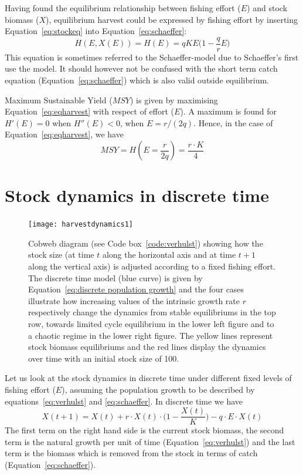 \documentclass[11pt,fleqn]{book} %
\begin{document}
Having found the equilibrium relationship between fishing effort ($E$) and stock biomass ($X$), equilibrium harvest could be expressed by fishing effort by inserting Equation~\ref{eq:stockeq} into Equation~\ref{eq:schaeffer}:
\begin{equation}
\label{eq:eqharvest}
H(E, X(E)) = H(E) = q K E \Big(1 - \frac{q}{r} E\Big)
\end{equation}
This equation is sometimes referred to the Schaeffer-model due to Schaeffer's first use the model. It should however not be confused with the short term catch equation (Equation~\ref{eq:schaeffer}) which is also valid outside equilibrium.

\label{MSY}Maximum Sustainable Yield ($MSY$) is given by maximising Equation~\ref{eq:eqharvest} with respect of effort ($E$). A maximum is found for $H'(E) = 0$ when $H''(E) < 0$, when $E = r/(2 q)$. Hence, in the case of Equation~\ref{eq:eqharvest}, we have
\begin{equation}
\label{eq:msy}
 MSY = H(E = \frac{r}{2 q}) = \frac{r \cdot K}{4}
\end{equation}

\section{Stock dynamics in discrete time}
\begin{figure}[ht]
\centering\texttt{[image: harvestdynamics1]}
\caption{Cobweb diagram (see Code box~\ref{code:verhulst}) showing how the stock size (at time $t$ along the horizontal axis and at time $t+1$ along the vertical axis) is adjusted according to a fixed fishing effort. The discrete time model (blue curve) is given by Equation~\ref{eq:discrete population growth} and the four cases illustrate how increasing values of the intrinsic growth rate $r$ respectively change the dynamics from stable equilibriums in the top row, towards limited cycle equilibrium in the lower left figure and to a chaotic regime in the lower right figure. The yellow lines represent stock biomass equilibriums and the red lines display the dynamics over time with an initial stock size of 100.}
\label{fig:cobwebharvest}
\end{figure}
\hfill \break
Let us look at the stock dynamics in discrete time under different fixed levels of fishing effort ($E$), assuming the population growth to be described by equations~\ref{eq:verhulst} and \ref{eq:schaeffer}. In discrete time we have
\begin{equation} 
\label{eq:discrete population growth}
X(t+1) = X(t) + r\cdot X(t) \cdot \bigg(1 - \frac{X(t)}{K}\bigg) - q\cdot E\cdot X(t)
\end{equation}
The first term on the right hand side is the current stock biomass, the second term is the natural growth per unit of time (Equation~\ref{eq:verhulst}) and the last term is the biomass which is removed from the stock in terms of catch (Equation~\ref{eq:schaeffer}).
\end{document}
